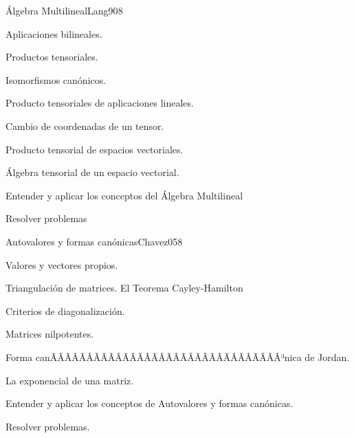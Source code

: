 \begin{sumilla}
\begin{unit}{\'Algebra Multilineal}{Lang90}{8}
   \begin{topicos}
         \item  Aplicaciones bilineales.
	 \item  Productos tensoriales.
         \item  Isomorfismos can\'onicos.
	 \item  Producto tensoriales de aplicaciones lineales.
         \item  Cambio de coordenadas de un tensor.
	 \item  Producto tensorial de espacios vectoriales.
         \item  \'Algebra tensorial de un espacio vectorial.
   \end{topicos}

   \begin{objetivos}
         \item  Entender y aplicar los conceptos del \'Algebra Multilineal
         \item  Resolver problemas
   \end{objetivos}
\end{unit}

\begin{unit}{Autovalores y formas can\'onicas}{Chavez05}{8}
   \begin{topicos}
	\item  Valores y vectores propios.
	\item  Triangulaci\'on de matrices. El Teorema Cayley-Hamilton
	\item  Criterios de diagonalizaci\'on.
	\item  Matrices nilpotentes.
	\item Forma canÃÂÃÂÃÂÃÂÃÂÃÂÃÂÃÂÃÂÃÂÃÂÃÂÃÂÃÂÃÂÃÂ³nica de Jordan.
	\item La exponencial de una matriz.
   \end{topicos}

   \begin{objetivos}
         \item  Entender y aplicar los conceptos de Autovalores y formas can\'onicas.
         \item  Resolver problemas.
   \end{objetivos}
\end{unit}


\end{sumilla}
